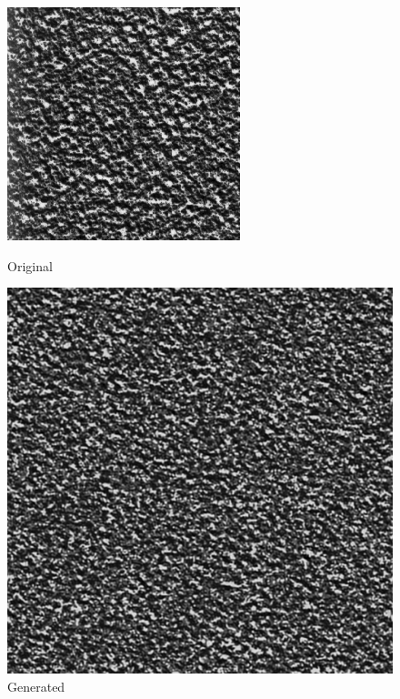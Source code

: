 \documentclass{article}
\begin{document}
    \begin{figure}[!htb]
    \begin{center}
      \includegraphics[scale=.32]{5/report/steerable/13.png}
      \caption{Original}
    \end{center}
    \endminipage \hfill
    \begin{center}
      \includegraphics[scale=.34]{5/report/steerable/13_c.png}
      \caption{Generated}
    \end{center}
    \endminipage
    \end{figure} 
\end{document}

